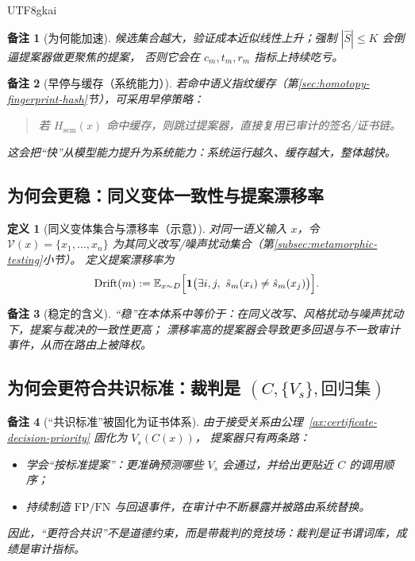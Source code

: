 \documentclass[12pt]{article}
\newtheorem{definition}{定义}[section]
\newtheorem{remark}{备注}[section]
\begin{document}
\begin{CJK*}{UTF8}{gkai}
\begin{remark}[为何能加速]
候选集合越大，验证成本近似线性上升；强制 $|\widehat{S}|\le K$ 会倒逼提案器做更聚焦的提案，
否则它会在 $c_m,t_m,r_m$ 指标上持续吃亏。
\end{remark}

\begin{remark}[早停与缓存（系统能力）]
若命中语义指纹缓存（第\ref{sec:homotopy-fingerprint-hash}节），可采用早停策略：
\begin{quote}
若 $H_{\mathrm{sem}}(x)$ 命中缓存，则跳过提案器，直接复用已审计的签名/证书链。
\end{quote}
这会把“快”从模型能力提升为系统能力：系统运行越久、缓存越大，整体越快。
\end{remark}

\subsection{为何会更稳：同义变体一致性与提案漂移率}
\label{subsec:stability-pressure}

\begin{definition}[同义变体集合与漂移率（示意）]
对同一语义输入 $x$，令 $\mathcal{V}(x)=\{x_1,\ldots,x_n\}$ 为其同义改写/噪声扰动集合（第\ref{subsec:metamorphic-testing}小节）。
定义提案漂移率为
\[
\mathrm{Drift}(m):=\mathbb{E}_{x\sim D}\Bigl[\mathbf{1}\bigl(\exists i,j,\ \hat{s}_m(x_i)\neq \hat{s}_m(x_j)\bigr)\Bigr]
  .
\]
\end{definition}

\begin{remark}[稳定的含义]
“稳”在本体系中等价于：在同义改写、风格扰动与噪声扰动下，提案与裁决的一致性更高；
漂移率高的提案器会导致更多回退与不一致审计事件，从而在路由上被降权。
\end{remark}

\subsection{为何会更符合共识标准：裁判是 \texorpdfstring{$(C,\{V_s\},\text{回归集})$}{(C,Vs,regression)}}
\label{subsec:consensus-pressure}

\begin{remark}[“共识标准”被固化为证书体系]
由于接受关系由公理~\ref{ax:certificate-decision-priority} 固化为 $V_s(C(x))$，
提案器只有两条路：
\begin{itemize}
  \item 学会“按标准提案”：更准确预测哪些 $V_s$ 会通过，并给出更贴近 $C$ 的调用顺序；
  \item 持续制造 $\mathrm{FP}/\mathrm{FN}$ 与回退事件，在审计中不断暴露并被路由系统替换。
\end{itemize}
因此，“更符合共识”不是道德约束，而是带裁判的竞技场：裁判是证书谓词库，成绩是审计指标。
\end{remark}


\end{CJK*}
\end{document}
